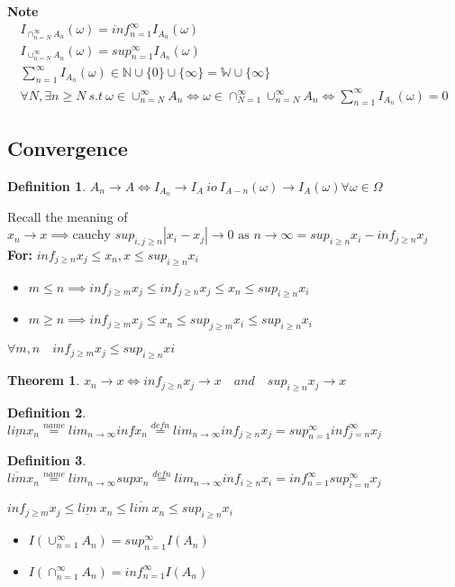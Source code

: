 \documentclass{article}
\theoremstyle{definition}
\newtheorem{definition}{Definition}[section]
\theoremstyle{thrm}
\newtheorem{thrm}{Theorem}[section]
\theoremstyle{lma}
\theoremstyle{ppst}
\theoremstyle{crlr}
\begin{document}
\textbf{Note}
\begin{align*}
	I_{\cap_{n=N}^\infty A_n}(\omega) = inf_{n=1}^\infty I_{A_n}(\omega)\\
	I_{\cup_{n=N}^\infty A_n}(\omega) = sup_{n=1}^\infty I_{A_n}(\omega)\\
	\sum_{n=1}^\infty I_{A_n}(\omega) \in \mathbb{N}\cup\{0\}\cup \{\infty\} = \mathbb{W} \cup \{\infty\}\\
	\forall N, \exists n \geq N \ s.t \ \omega \in \cup_{n=N}^\infty A_n \iff \omega \in \cap_{N=1}^\infty \cup_{n=N}^\infty A_n \iff \sum_{n=1}^\infty I_{A_n}(\omega) =0
\end{align*}


\subsection{Convergence}
\begin{definition}
	$A_n\rightarrow A \iff I_{A_n} \rightarrow I_A \ io \  I_{A-n}(\omega)\rightarrow I_A(\omega) \forall \omega \in\Omega$
\end{definition}
Recall the meaning of $x_n\to x \implies \text{cauchy } sup_{i,j\geq n}|x_i-x_j|\to 0 \text{ as } n \to \infty 
	=sup_{i\geq n}x_i - inf_{j\geq n}x_j$\\
\textbf{For: }$inf_{j\geq n}x_j \leq x_n, x \leq sup_{i\geq n}x_i$
\begin{itemize}
	\item $m \leq n \implies inf_{j\geq m}x_j\leq inf_{j\geq n}x_j \leq x_n \leq sup_{i\geq n}x_i$
	\item $m \geq n \implies inf_{j\geq m}x_j\leq x_n \leq sup_{j\geq m}x_i \leq  sup_{i\geq n}x_i$
\end{itemize}
$\forall m,n \quad inf_{j\geq m}x_j \leq sup_{i\geq n}xi$
\begin{thrm}
	$x_n\to x \iff inf_{j\geq n}x_j \to x \quad and \quad  sup_{i\geq n}x_j \to x$
\end{thrm}
\begin{definition}
	$\underline{lim}x_n \stackrel{name}{=} lim_{n\to \infty} inf x_n \stackrel{defn}{=} lim_{n\to \infty} inf_{j\geq n}x_j  = sup_{n=1}^\infty inf_{j=n}^\infty x_j $
\end{definition}
\begin{definition}
	$\overline{lim}x_n \stackrel{name}{=} lim_{n\to \infty} sup x_n \stackrel{defn}{=} lim_{n\to \infty} inf_{i\geq n}x_i  = inf_{n=1}^\infty sup_{i=n}^\infty x_j $
\end{definition}
$inf_{j\geq m}x_j \leq \underline{lim}\ x_n \leq \overline{lim\ }x_n \leq sup_{i\geq n} x_i$
\begin{itemize}
	\item $I(\cup_{n=1}^\infty A_n) = sup_{n=1}^\infty I (A_n)$
	\item $I(\cap_{n=1}^\infty A_n) = inf_{n=1}^\infty I (A_n)$
\end{itemize}
\end{document}
